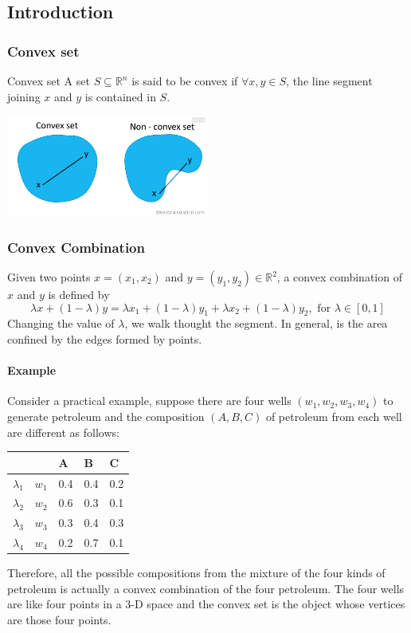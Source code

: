 \subsection{Introduction}
\subsubsection{Convex set}
Convex set A set $S \subseteq \mathbb{R}^n$ is said to be convex if $\forall 
x,y \in S$, the line segment joining $x$ and $y$ is contained in $S$.

\centerline{\includegraphics[width=0.5\textwidth]{convex-nonconvex-set.png}}
\subsubsection{Convex Combination}
Given two points $x=(x_1, x_2)$ and $y = (y_1, y_2) \in \mathbb{R}^2$, a convex 
combination of $x$ and $y$ is defined by
\[\lambda x + (1 - \lambda) y = \lambda x_1 + (1 - \lambda)y_1 + \lambda x_2 + 
(1 - \lambda)y_2, \text{ for } \lambda \in [0,1]\]
Changing the value of $\lambda$, we walk thought the segment. In general, 
 is the area confined by the edges formed by points.
 
 \paragraph{Example} Consider a practical example, suppose there are four wells 
$(w_1, w_2, w_3, w_4)$ to generate petroleum and the composition $(A, B, C)$ of 
petroleum from each well are different as follows:

\begin{table}[H]
\centering
\begin{tabular}{|l|l|l|l|l|}
\hline
            &       & A   & B   & C   \\ \hline
$\lambda_1$ & $w_1$ & 0.4 & 0.4 & 0.2 \\ \hline
$\lambda_2$ & $w_2$ & 0.6 & 0.3 & 0.1 \\ \hline
$\lambda_3$ & $w_3$ & 0.3 & 0.4 & 0.3 \\ \hline
$\lambda_4$ & $w_4$ & 0.2 & 0.7 & 0.1 \\ \hline
\end{tabular}
\end{table}
Therefore, all the possible compositions from the mixture of the four kinds of 
petroleum is actually a convex combination of the four petroleum. The four 
wells are like four points in a 3-D space and the convex set is the object 
whose vertices are those four points.


